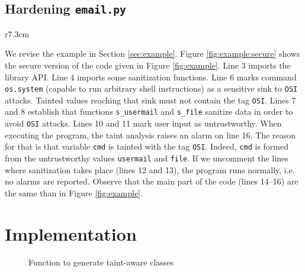 \documentclass[oribibl]{llncs}
\newcommand{\nametklass}{taint-aware }
\begin{document}
\subsection{Hardening \texttt{email.py}}
\label{sec:secure:email}

\begin{wrapfigure}{r}{7.3cm}
\vspace{-30pt}
{\small{

\caption{\label{fig:example:secure} Secure version of module \texttt{email.py} }
\vspace{-10pt}
}}
\end{wrapfigure}

We revise the example in Section \ref{sec:example}. 
Figure \ref{fig:example:secure} shows the secure version of the code given 
in Figure \ref{fig:example}. 
Line 3 imports the library API. 
Line 4 imports some sanitization functions. 
Line 6 marks command \texttt{os.system} (capable
to run arbitrary shell instructions) as a
sensitive sink to \texttt{OSI} attacks.
Tainted values reaching that sink must 
not contain the tag \texttt{OSI}.
%
Lines 7 and 8 establish 
that 
functions \texttt{s\_usermail} and \texttt{s\_file}
sanitize data in order to avoid \texttt{OSI}
attacks.
Lines 10 and 11 mark user input as untrustworthy.
When executing the program, the taint analysis  
raises an alarm on line 16.
The reason for that is that 
variable \texttt{cmd} is tainted with the tag \texttt{OSI}. 
Indeed, \texttt{cmd} is formed from the untrustworthy values 
\texttt{usermail} and \texttt{file}. 
If we uncomment the lines where sanitization 
takes place (lines 12 and 13), the program runs normally, i.e. no
alarms are reported. 
Observe that the main part of the code (lines 14--16)  
are the same than in Figure \ref{fig:example}. 

\section{Implementation}
\label{sec:implementation}
\begin{figure}[t]
{\small{

\caption{\label{fig:generate} Function to generate \nametklass classes}
}}
\end{figure}
\end{document}
